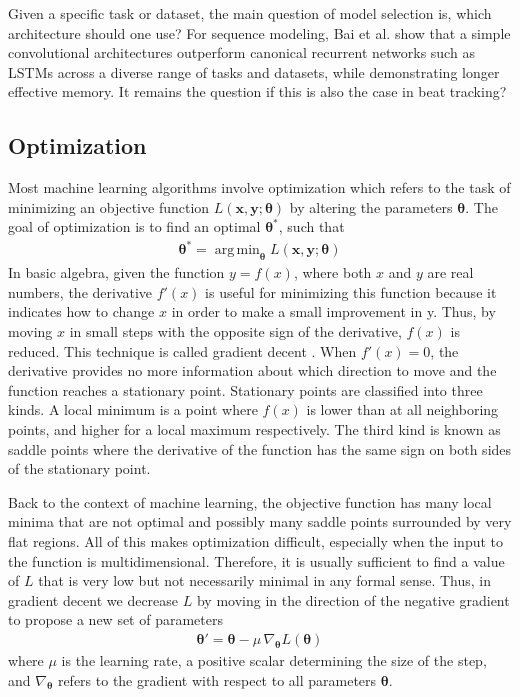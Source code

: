 \documentclass{scrartcl}
\DeclareMathOperator*{\argmin}{arg\,min}
\begin{document}
Given a specific task or dataset, the main question of model selection is, which architecture should one use? For sequence modeling, Bai et al. \cite{Bai2018} show that a simple convolutional architectures outperform canonical recurrent networks such as LSTMs across a diverse range of tasks and datasets, while demonstrating longer effective memory. It remains the question if this is also the case in beat tracking?



\subsection{Optimization}

Most machine learning algorithms involve optimization which refers to the task of minimizing an objective function $L(\mathbf x, \mathbf y; \boldsymbol \theta)$ by altering the parameters $\boldsymbol \theta$. The goal of optimization is to find an optimal $\boldsymbol \theta^*$, such that
\begin{align}
\boldsymbol \theta^* = \argmin_{\boldsymbol \theta} L(\mathbf x, \mathbf y; \boldsymbol \theta)
\end{align} 
In basic algebra, given the function $y=f(x)$, where both $x$ and $y$ are real numbers, the derivative $f'(x)$ is useful for minimizing this function because it indicates how to change $x$ in order to make a small improvement in y. Thus, by moving $x$ in small steps with the opposite sign of the derivative, $f(x)$ is reduced. This technique is called gradient decent \cite{Cauchy1847}. When $f'(x)=0$, the derivative provides no more information about which direction to move and the function reaches a stationary point. Stationary points are classified into three kinds. A local minimum is a point where $f(x)$ is lower than at all neighboring points, and higher for a local maximum respectively. The third kind is known as saddle points where the derivative of the function has the same sign on both sides of the stationary point.  

Back to the context of machine learning, the objective function has many local minima that are not optimal and possibly many saddle points surrounded by very flat regions. All of this makes optimization difficult, especially when the input to the function is multidimensional. Therefore, it is usually sufficient to find a value of $L$ that is very low but not necessarily minimal in any formal sense. Thus, in gradient decent we decrease $L$ by moving in the direction of the negative gradient to propose a new set of parameters
\begin{align}
\boldsymbol \theta' = \boldsymbol \theta - \mu \,\nabla_{\boldsymbol \theta}L(\boldsymbol \theta)
\end{align} 
where $\mu$ is the learning rate, a positive scalar determining the size of the step, and $\nabla_{\boldsymbol \theta}$ refers to the gradient with respect to all parameters $\boldsymbol \theta$.
\end{document}
